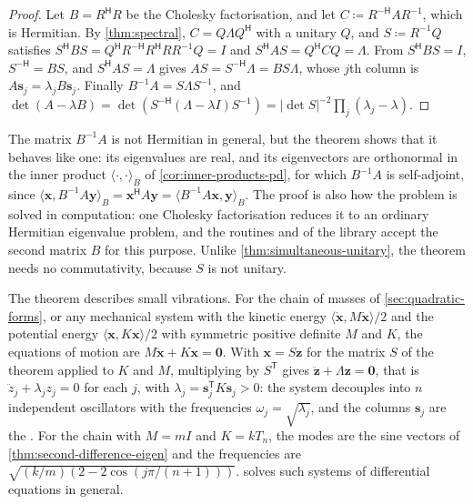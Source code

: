\begin{proof}
Let $B=R^{\mathsf H}R$ be the Cholesky factorisation, and let $C\coloneqq R^{-\mathsf H}AR^{-1}$, which is Hermitian. By \cref{thm:spectral}, $C=Q\Lambda Q^{\mathsf H}$ with a unitary $Q$, and $S\coloneqq R^{-1}Q$ satisfies $S^{\mathsf H}BS=Q^{\mathsf H}R^{-\mathsf H}R^{\mathsf H}RR^{-1}Q=I$ and $S^{\mathsf H}AS=Q^{\mathsf H}CQ=\Lambda$. From $S^{\mathsf H}BS=I$, $S^{-\mathsf H}=BS$, and $S^{\mathsf H}AS=\Lambda$ gives $AS=S^{-\mathsf H}\Lambda=BS\Lambda$, whose $j$th column is $A\mathbf s_j=\lambda_jB\mathbf s_j$. Finally $B^{-1}A=S\Lambda S^{-1}$, and $\det(A-\lambda B)=\det(S^{-\mathsf H}(\Lambda-\lambda I)S^{-1})=|\det S|^{-2}\prod_j(\lambda_j-\lambda)$.
\end{proof}

The matrix $B^{-1}A$ is not Hermitian in general, but the theorem shows that it behaves like one: its eigenvalues are real, and its eigenvectors are orthonormal in the inner product $\langle\cdot,\cdot\rangle_B$ of \cref{cor:inner-products-pd}, for which $B^{-1}A$ is self-adjoint, since $\langle\mathbf x,B^{-1}A\mathbf y\rangle_B=\mathbf x^{\mathsf H}A\mathbf y=\langle B^{-1}A\mathbf x,\mathbf y\rangle_B$. The proof is also how the problem is solved in computation: one Cholesky factorisation reduces it to an ordinary Hermitian eigenvalue problem, and the routines  and  of the library accept the second matrix $B$ for this purpose. Unlike \cref{thm:simultaneous-unitary}, the theorem needs no commutativity, because $S$ is not unitary.

The theorem describes small vibrations. For the chain of masses of \cref{sec:quadratic-forms}, or any mechanical system with the kinetic energy $\langle\dot{\mathbf x},M\dot{\mathbf x}\rangle/2$ and the potential energy $\langle\mathbf x,K\mathbf x\rangle/2$ with symmetric positive definite $M$ and $K$, the equations of motion are $M\ddot{\mathbf x}+K\mathbf x=\mathbf 0$. With $\mathbf x=S\mathbf z$ for the matrix $S$ of the theorem applied to $K$ and $M$, multiplying by $S^{\mathsf T}$ gives $\ddot{\mathbf z}+\Lambda\mathbf z=\mathbf 0$, that is $\ddot z_j+\lambda_jz_j=0$ for each $j$, with $\lambda_j=\mathbf s_j^{\mathsf T}K\mathbf s_j>0$: the system decouples into $n$ independent oscillators with the frequencies $\omega_j=\sqrt{\lambda_j}$, and the columns $\mathbf s_j$ are the . For the chain with $M=mI$ and $K=kT_n$, the modes are the sine vectors of \cref{thm:second-difference-eigen} and the frequencies are $\sqrt{(k/m)(2-2\cos(j\pi/(n+1)))}$.  solves such systems of differential equations in general.

